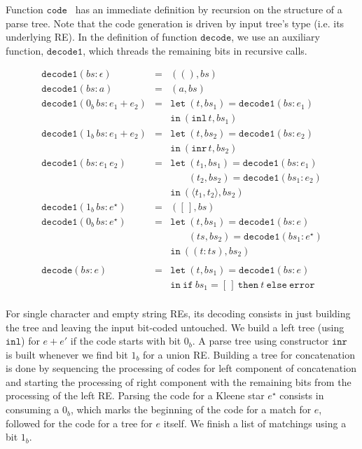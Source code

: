 \documentclass[oneside,12pt]{scrbook}
\theoremstyle{definition}
\newcommand{\inl}{\ensuremath{\texttt{inl}}}
\newcommand{\inr}{\ensuremath{\texttt{inr}}}
\newcommand{\code}{\ensuremath{\texttt{code}}}
\newcommand{\decodee}{\ensuremath{\texttt{decode}}}
\newcommand{\decodeo}{\ensuremath{\texttt{decode1}}}
\newcommand{\leti}{\ensuremath{\texttt{let}}}
\newcommand{\iin}{\ensuremath{\texttt{in}}}
\newcommand{\iif}{\ensuremath{\texttt{if}}}
\newcommand{\tthen}{\ensuremath{\texttt{then}}}
\newcommand{\eelse}{\ensuremath{\texttt{else}}}
\newcommand{\eerror}{\ensuremath{\texttt{error}}}
\theoremstyle{plain}
\theoremstyle{definition}
\begin{document}
Function \code~ has an immediate definition by recursion on the structure of a parse tree.
Note that the code generation is driven by input tree's type (i.e. its underlying RE).
In the definition of function \decodee, we use an auxiliary function, \decodeo, which 
threads the remaining bits in recursive calls.

\[
\begin{array}{lcl}
	\decodeo (bs : \epsilon) & = & ((), bs) \\
	\decodeo (bs : a)        & = & (a , bs) \\
	\decodeo (0_b\,bs : e_1 + e_2) & = & \leti\:(t,bs_1) = \decodeo (bs : e_1)\\
	&   & \iin\:(\inl\,t,bs_1)\\ 
	\decodeo (1_b\,bs : e_1 + e_2) & = & \leti\:(t,bs_2) = \decodeo (bs : e_2)\\
	&   & \iin\:(\inr\,t,bs_2)\\ 
	\decodeo (bs : e_1\,e_2) & = & \leti\:(t_1,bs_1) = \decodeo(bs : e_1) \\
	&   & \,\,\,\,\,\,\,\,\,\,\,(t_2,bs_2) = \decodeo(bs_1 : e_2)\\
	&   & \iin\:(\langle t_1,t_2\rangle, bs_2)\\
	\decodeo (1_b\,bs : e^\star) & = & ([\,],bs)\\
	\decodeo (0_b\,bs : e^\star) & = & \leti\:(t,bs_1) = \decodeo (bs : e)\\
	&   & \,\,\,\,\,\,\,\,\,\,\,(ts,bs_2) = \decodeo(bs_1 : e ^\star) \\ 
	&   & \iin\: ((t : ts), bs_2)\\
	\\
	\decodee (bs : e) & = & \leti\:(t,bs_1) = \decodeo(bs : e)\\
	&   & \iin\:\iif\:bs_1 = [\,]\:\tthen\:t\:\eelse\:\eerror \\
	\end{array}
\]


For single character and empty string REs, its decoding consists in just building
the tree and leaving the input bit-coded untouched. We build a left tree (using \inl)
for $e + e'$ if the code starts with bit $0_b$. A parse tree using constructor \inr~ is built
whenever we find bit $1_b$ for a union RE. Building a tree for concatenation is done by
sequencing the processing of codes for left component of concatenation and starting the
processing of right component with the remaining bits from the processing of the
left RE. Parsing the code for a Kleene star $e^\star$ consists in consuming a $0_b$, which
marks the beginning of the code for a match for $e$, followed for the code for a
tree for $e$ itself. We finish a list of matchings using a bit $1_b$.
\end{document}
